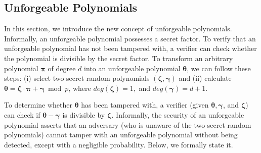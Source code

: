 





\vspace{-3mm}

\subsection{Unforgeable Polynomials}

\vspace{-1.5mm}

In this section, we introduce the new concept of unforgeable polynomials. Informally, an unforgeable polynomial possesses a secret factor. To verify that an unforgeable polynomial has not been tampered with, a verifier can check whether the polynomial is divisible by the secret factor. 
%
To transform an arbitrary polynomial $\bm\pi$ of degree $d$ into an unforgeable polynomial $\bm\theta$, we can follow these steps: (i) select two secret random polynomials $(\bm\zeta, \bm \gamma)$ and (ii) calculate $\bm\theta=\bm\zeta\cdot\bm \pi + \bm \gamma \bmod p$, where  $deg(\bm\zeta)= 1, $ and   $deg(\bm\gamma)= d+1$. 


To determine whether $\bm\theta$ has been tampered with, a verifier (given $\bm\theta, \bm \gamma$, and $\bm\zeta$) can check if $\bm\theta-\bm \gamma$ is divisible by $\bm\zeta$. Informally, the security of an unforgeable polynomial asserts that an adversary (who is unaware of the two secret random polynomials) cannot tamper with an unforgeable polynomial without being detected, except with a negligible probability. Below, we formally state it. 

